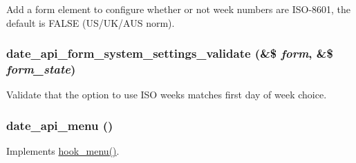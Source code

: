 Add a form element to configure whether or not week numbers are ISO-\/8601, the default is FALSE (US/UK/AUS norm). \hypertarget{date__api_8module_affcb2404b858829a6c6f2ac740541948}{
\subsubsection[{date\_\-api\_\-form\_\-system\_\-settings\_\-validate}]{\setlength{\rightskip}{0pt plus 5cm}date\_\-api\_\-form\_\-system\_\-settings\_\-validate (\&\$ {\em form}, \/  \&\$ {\em form\_\-state})}}
\label{date__api_8module_affcb2404b858829a6c6f2ac740541948}
Validate that the option to use ISO weeks matches first day of week choice. \hypertarget{date__api_8module_a13080af83552f547918ec86a9027ef62}{
\subsubsection[{date\_\-api\_\-menu}]{\setlength{\rightskip}{0pt plus 5cm}date\_\-api\_\-menu ()}}
\label{date__api_8module_a13080af83552f547918ec86a9027ef62}
Implements \hyperlink{group__hooks_ga5c95244fea59b25666e409759e133ded}{hook\_\-menu()}.

